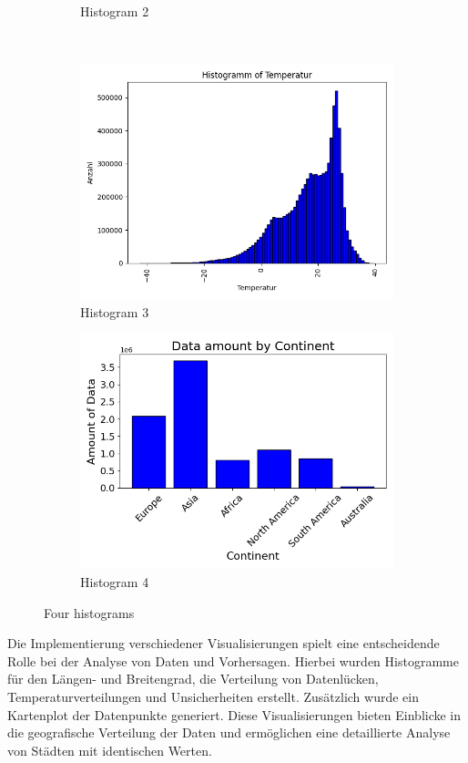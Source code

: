 \documentclass[manuscript,screen,review]{acmart}
\begin{document}
\begin{figure}[htp]
\begin{subfigure}{.45\textwidth}
      \caption{Histogram 2}
      \label{fig:sub2}
  \end{subfigure}\\
  \begin{subfigure}{.45\textwidth}
      \centering
      \includegraphics[width=.8\linewidth]{./histograms/Temperatur}
      \caption{Histogram 3}
      \label{fig:sub3}
  \end{subfigure}%
  \begin{subfigure}{.45\textwidth}
      \centering
      \includegraphics[width=.8\linewidth]{./histograms/Continents}
      \caption{Histogram 4}
      \label{fig:sub4}
  \end{subfigure}
  \caption{Four histograms}
  \label{fig:test}
\end{figure}

Die Implementierung verschiedener Visualisierungen spielt eine entscheidende Rolle bei der Analyse von Daten und Vorhersagen. 
Hierbei wurden Histogramme für den Längen- und Breitengrad, die Verteilung von Datenlücken, Temperaturverteilungen und Unsicherheiten erstellt. 
Zusätzlich wurde ein Kartenplot der Datenpunkte generiert. 
Diese Visualisierungen bieten Einblicke in die geografische Verteilung der Daten und ermöglichen eine detaillierte Analyse von Städten mit identischen Werten.
\end{document}
